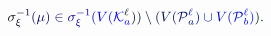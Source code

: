 \documentclass[12pt]{article}
\begin{document}
\makeatletter
\renewcommand*{\@textcolor}[3]{%
  \protect\leavevmode
  \begingroup
    \color#1{#2}#3%
  \endgroup
}
\makeatother
\begin{displaymath}
\mathcolor[RGB]{0,0,15}{\sigma} _ { \mathcolor[RGB]{0,0,30}{\xi} } ^ { \mathcolor[RGB]{0,0,45}{-} \mathcolor[RGB]{0,0,60}{1} } \mathcolor[RGB]{0,0,75}{(} \mathcolor[RGB]{0,0,90}{\mu} \mathcolor[RGB]{0,0,105}{)} \mathcolor[RGB]{0,0,120}{\in} \mathcolor[RGB]{0,0,135}{\sigma} _ { \mathcolor[RGB]{0,0,150}{\xi} } ^ { \mathcolor[RGB]{0,0,165}{-} \mathcolor[RGB]{0,0,180}{1} } \mathcolor[RGB]{0,0,195}{(} \mathcolor[RGB]{0,0,210}{V} \mathcolor[RGB]{0,0,225}{(} \mathcal { \mathcolor[RGB]{0,0,240}{K} } _ { \mathcolor[RGB]{0,0,255}{a} } ^ { \mathcolor[RGB]{0,15,0}{\ell} } \mathcolor[RGB]{0,15,15}{)} \mathcolor[RGB]{0,15,30}{)} \mathcolor[RGB]{0,15,45}{\setminus} \mathcolor[RGB]{0,15,60}{(} \mathcolor[RGB]{0,15,75}{V} \mathcolor[RGB]{0,15,90}{(} \mathcal { \mathcolor[RGB]{0,15,105}{P} } _ { \mathcolor[RGB]{0,15,120}{a} } ^ { \mathcolor[RGB]{0,15,135}{\ell} } \mathcolor[RGB]{0,15,150}{)} \mathcolor[RGB]{0,15,165}{\cup} \mathcolor[RGB]{0,15,180}{V} \mathcolor[RGB]{0,15,195}{(} \mathcal { \mathcolor[RGB]{0,15,210}{P} } _ { \mathcolor[RGB]{0,15,225}{b} } ^ { \mathcolor[RGB]{0,15,240}{\ell} } \mathcolor[RGB]{0,15,255}{)} \mathcolor[RGB]{0,30,0}{)} \mathcolor[RGB]{0,30,15}{.}
\end{displaymath}
\end{document}

